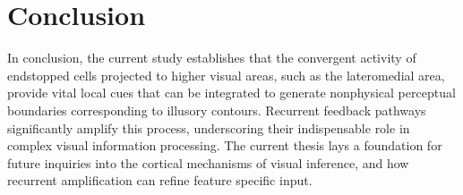 \documentclass[12pt]{article}
\begin{document}
\section*{Conclusion}
In conclusion, the current study establishes that the convergent activity of endstopped cells projected to higher visual areas, such as the lateromedial area, provide vital  local cues that can be integrated to generate nonphysical perceptual boundaries corresponding to illusory contours. Recurrent feedback pathways significantly amplify this process, underscoring their indispensable role in complex visual information processing. The current thesis lays a foundation for future inquiries into the cortical mechanisms of visual inference, and how recurrent amplification can refine feature specific input. 



\end{document}

